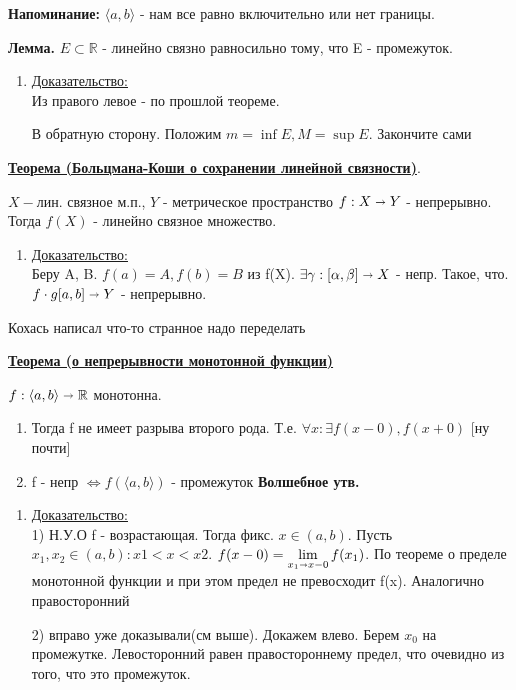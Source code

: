 \documentclass{article}
\newcommand{\thmm}[1]{\underline{\textbf{#1}}}
\newcommand{\prooff}[1]{{\underline{Доказательство:}} \\ }
\begin{document}
\textbf{Напоминание:} $\langle a,b \rangle$ - нам все равно включительно или нет границы.

\textbf{Лемма.} $E \subset \mathbb{R}$ - линейно связно равносильно тому, что E - промежуток. 

\begin{enumerate}
    \item[] \prooff{}
    Из правого левое - по прошлой теореме.

    В обратную сторону.  Положим $m = \inf E, M = \sup E$. Закончите сами  %
\end{enumerate}

\thmm{Теорема (Больцмана-Коши о сохранении линейной связности)}.

$X - $лин. связное м.п., $Y$ - метрическое пространство $f: X \shortrightarrow Y$ - непрерывно. Тогда $f(X)$ - линейно связное множество.
\begin{enumerate}
    \item[] \prooff{}
   Беру A, B. $f(a) = A, f(b) = B$ из f(X). $\exists \gamma: [\alpha,\beta] \shortrightarrow X$ - непр. Такое, что. $f \cdot g [a,b] \shortrightarrow Y$ - непрерывно.
\end{enumerate}

Кохась написал что-то странное надо переделать


\thmm{Теорема (о непрерывности монотонной функции)}

$f: \langle a,b\rangle \shortrightarrow \mathbb{R}$ монотонна. 

\begin{enumerate}
    \item Тогда f не имеет разрыва второго рода.
     Т.е. $\forall x: \exists f(x-0), f(x+0)$ [ну почти]
     \item f - непр $\Leftrightarrow f(\langle a,b\rangle)$ - промежуток \textbf{Волшебное утв.}
\end{enumerate}

\begin{enumerate}
    \item[] \prooff{}
   1) Н.У.О f - возрастающая. Тогда фикс. $x\in (a,b)$. Пусть $x_1,x_2\in (a,b): x1<x<x2$. $f(x-0)=\lim\limits_{x_1\shortrightarrow x-0} f(x_1)$. По теореме о пределе монотонной функции и при этом предел не превосходит f(x). Аналогично правосторонний

   2) вправо уже доказывали(см выше). Докажем влево. Берем $x_0$ на промежутке. Левосторонний равен правостороннему предел, что очевидно из того, что это промежуток.   
\end{enumerate}
\end{document}

